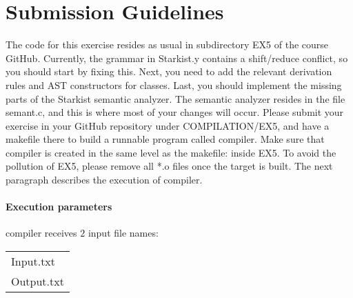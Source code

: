 \documentclass{article}
\begin{document}
\section{Submission Guidelines}
The code for this exercise resides as usual in subdirectory EX5 of the course GitHub.
Currently, the grammar in Starkist.y contains a shift/reduce conflict,
so you should start by fixing this.
Next, you need to add the relevant derivation rules and AST constructors
for classes. Last, you should implement the missing parts of the Starkist semantic analyzer.
The semantic analyzer resides in the file semant.c, and this is where
most of your changes will occur.
Please submit your exercise in your GitHub repository under COMPILATION/EX5,
and have a makefile there to build a runnable program called compiler.
Make sure that compiler is created in the same level as the makefile: inside EX5.
To avoid the pollution of EX5, please remove all *.o files once the target is built.
The next paragraph describes the execution of compiler.

\paragraph{Execution parameters}
compiler receives $2$ input file names:
\begin{table}[h]
\centering
\begin{tabular}{ l }
  Input.txt  \\
  Output.txt \\
\end{tabular}
\end{table}
\end{document}
